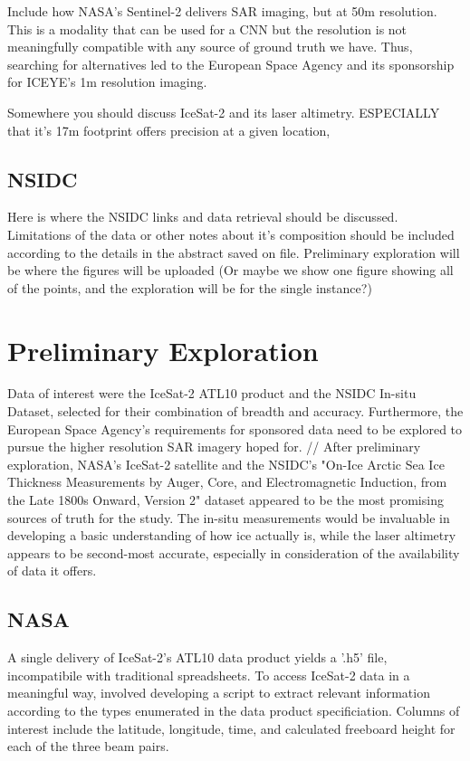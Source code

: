 Include how NASA's Sentinel-2 delivers SAR imaging, but at 50m resolution. This is a modality that can be used for a CNN but the resolution is not meaningfully compatible with any source of ground truth we have. Thus, searching for alternatives led to the European Space Agency and its sponsorship for ICEYE's 1m resolution imaging.

Somewhere you should discuss IceSat-2 and its laser altimetry. ESPECIALLY that it's 17m footprint offers precision at a given location, 
\subsection*{NSIDC}
Here is where the NSIDC links and data retrieval should be discussed. Limitations of the data or other notes about it's composition should be included according to the details in the abstract saved on file. Preliminary exploration will be where the figures will be uploaded (Or maybe we show one figure showing all of the points, and the exploration will be for the single instance?)

\section {Preliminary Exploration}
Data of interest were the IceSat-2 ATL10 product and the NSIDC In-situ Dataset, selected for their combination of breadth and accuracy. Furthermore, the European Space Agency's requirements for sponsored data need to be explored to pursue the higher resolution SAR imagery hoped for. //
After preliminary exploration, NASA's IceSat-2 satellite and the NSIDC's "On-Ice Arctic Sea Ice Thickness Measurements by Auger, Core, and Electromagnetic Induction, from the Late 1800s Onward, Version 2" dataset appeared to be the most promising sources of truth for the study. The in-situ measurements would be invaluable in developing a basic understanding of how ice actually is, while the laser altimetry appears to be second-most accurate, especially in consideration of the availability of data it offers.
\subsection*{NASA}
A single delivery of IceSat-2's ATL10 data product yields a '.h5' file, incompatibile with traditional spreadsheets. To access IceSat-2 data in a meaningful way, involved developing a script to extract relevant information according to the types enumerated in the data product specificiation. Columns of interest include the latitude, longitude, time, and calculated freeboard height for each of the three beam pairs.
